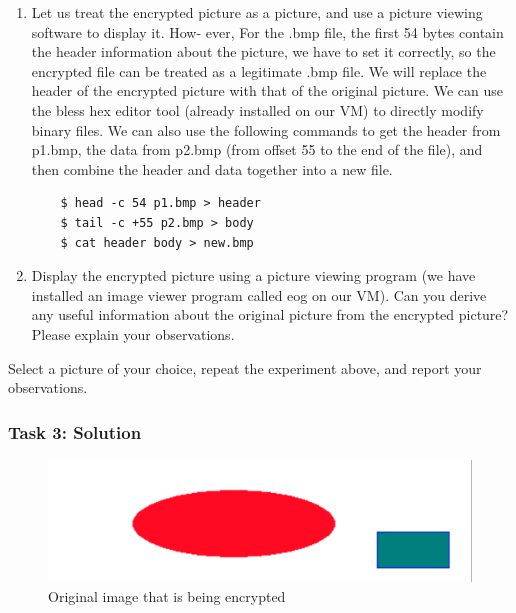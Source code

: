 \documentclass[12pt]{article}
\begin{document}
\begin{enumerate}
    \item Let us treat the encrypted picture as a picture, and use a picture viewing software to
    display it. How- ever, For the .bmp file, the first 54 bytes contain the header information about
    the picture, we have to set it correctly, so the encrypted file can be treated as a legitimate .bmp
    file. We will replace the header of the encrypted picture with that of the original picture. We can
    use the bless hex editor tool (already installed on our VM) to directly modify binary files. We can
    also use the following commands to get the header from p1.bmp, the data from p2.bmp (from offset 55
    to the end of the file), and then combine the header and data together into a new file.
    
    \begin{verbatim}
    $ head -c 54 p1.bmp > header
    $ tail -c +55 p2.bmp > body
    $ cat header body > new.bmp
    \end{verbatim}

    \item Display the encrypted picture using a picture viewing program (we have installed an image
    viewer
    program called eog on our VM). Can you derive any useful information about the original picture
    from the encrypted picture? Please explain your observations.
\end{enumerate}

Select a picture of your choice, repeat the experiment above, and report your observations.

\subsubsection{Task 3: Solution}

\begin{figure}[H]
    \begin{center}
        \includegraphics[scale=0.2]{t3p0.1.png}
    \end{center}{}
    \caption{Original image that is being encrypted}
    \label{fig:t3p0.1}
\end{figure}
\end{document}

